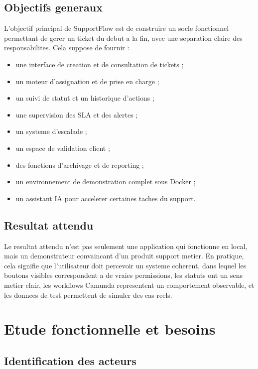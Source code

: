 \documentclass[12pt,a4paper,oneside]{report}
\begin{document}
\section{Objectifs generaux}

L'objectif principal de SupportFlow est de construire un socle fonctionnel permettant de gerer un ticket du debut a la fin, avec une separation claire des responsabilites. Cela suppose de fournir :

\begin{itemize}[leftmargin=1.2cm]
  \item une interface de creation et de consultation de tickets ;
  \item un moteur d'assignation et de prise en charge ;
  \item un suivi de statut et un historique d'actions ;
  \item une supervision des SLA et des alertes ;
  \item un systeme d'escalade ;
  \item un espace de validation client ;
  \item des fonctions d'archivage et de reporting ;
  \item un environnement de demonstration complet sous Docker ;
  \item un assistant IA pour accelerer certaines taches du support.
\end{itemize}

\section{Resultat attendu}

Le resultat attendu n'est pas seulement une application qui fonctionne en local, mais un demonstrateur convaincant d'un produit support metier. En pratique, cela signifie que l'utilisateur doit percevoir un systeme coherent, dans lequel les boutons visibles correspondent a de vraies permissions, les statuts ont un sens metier clair, les workflows Camunda representent un comportement observable, et les donnees de test permettent de simuler des cas reels.

\chapter{Etude fonctionnelle et besoins}

\section{Identification des acteurs}
\end{document}
